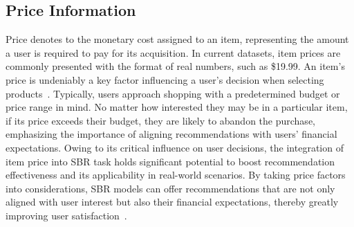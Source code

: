 \documentclass[lettersize,journal]{IEEEtran}
\begin{document}
\subsection{Price Information}
{Price} denotes to the monetary cost assigned to an item, representing the amount a user is required to pay for its acquisition. In current datasets, item prices are commonly presented with the format of real numbers, such as \$19.99.
An item's price is undeniably a key factor influencing a user’s decision when selecting products~\cite{Wu@ICDE2022,Zheng@ICDE2020,Wan@WWW2017price}. Typically, users approach shopping with a predetermined budget or price range in mind. No matter how interested they may be in a particular item, if its price exceeds their budget, they are likely to abandon the purchase, emphasizing the importance of aligning recommendations with users' financial expectations. Owing to its critical influence on user decisions, the integration of item price into SBR task holds significant potential to boost recommendation effectiveness and its applicability in real-world scenarios. By taking price factors into considerations, SBR models can offer recommendations that are not only aligned with user interest but also their financial expectations, thereby greatly improving user satisfaction~\cite{CoHHN,BiPNet}. 

\end{document}
